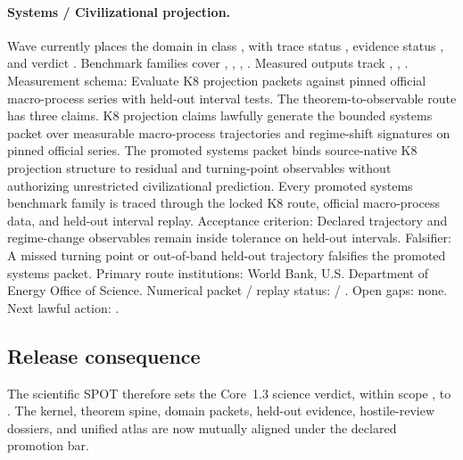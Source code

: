\paragraph{Systems / Civilizational projection.}
Wave  currently places the domain in class , with trace status , evidence status , and verdict .
Benchmark families cover , \allowbreak {}, \allowbreak {}, \allowbreak {}.
Measured outputs track , \allowbreak {}, \allowbreak {}.
Measurement schema: Evaluate K8 projection packets against pinned official macro-process series with held-out interval tests.
The theorem-to-observable route has three claims. K8 projection claims lawfully generate the bounded systems packet over measurable macro-process trajectories and regime-shift signatures on pinned official series. The promoted systems packet binds source-native K8 projection structure to residual and turning-point observables without authorizing unrestricted civilizational prediction. Every promoted systems benchmark family is traced through the locked K8 route, official macro-process data, and held-out interval replay.
Acceptance criterion: Declared trajectory and regime-change observables remain inside tolerance on held-out intervals.
Falsifier: A missed turning point or out-of-band held-out trajectory falsifies the promoted systems packet.
Primary route institutions: World Bank, \allowbreak U.S. Department of Energy Office of Science.
Numerical packet / replay status:  / .
Open gaps: none.
Next lawful action: .

\subsection{Release consequence}
The scientific SPOT therefore sets the Core~1.3 science verdict, within scope , to .
The kernel, theorem spine, domain packets, held-out evidence, hostile-review dossiers, and unified atlas are now mutually aligned under the declared promotion bar.
